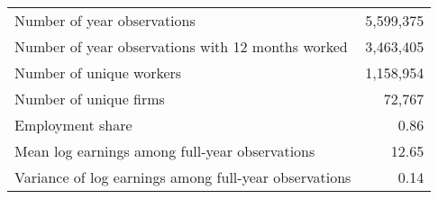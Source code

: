 \begin{tabular}{l r} 
\toprule 
Number of year observations & 5,599,375\\
Number of year observations with 12 months worked & 3,463,405\\
Number of unique workers & 1,158,954\\
Number of unique firms & 72,767\\
Employment share & 0.86\\[5pt]
Mean log earnings among full-year observations & 12.65\\
Variance of log earnings among full-year observations & 0.14\\
\bottomrule 
\end{tabular}
